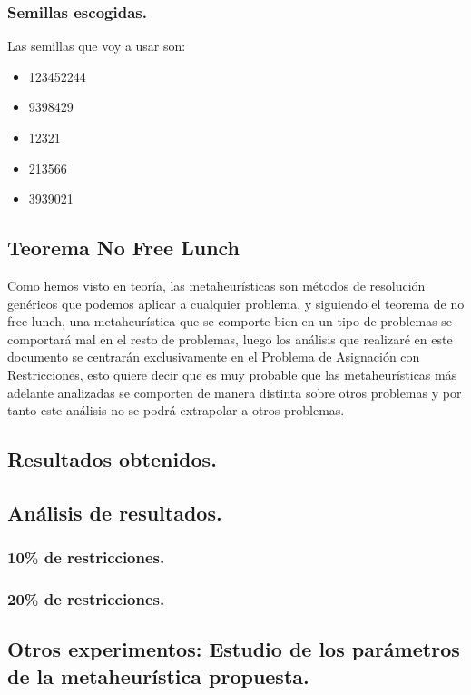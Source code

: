\documentclass[12pt, spanish]{article}
\begin{document}
\subsubsection{Semillas escogidas.}

Las semillas que voy a usar son:

\begin{itemize}
	\item {123452244}
	\item {9398429}
	\item {12321}
	\item {213566}
	\item {3939021}
\end{itemize}

\subsection{Teorema No Free Lunch}

Como hemos visto en teoría, las metaheurísticas son métodos de resolución genéricos que podemos aplicar a cualquier problema, y siguiendo el teorema de no free lunch, una metaheurística que se comporte bien en un tipo de problemas se comportará mal en el resto de problemas, luego los análisis que realizaré en este documento se centrarán exclusivamente en el Problema de Asignación con Restricciones, esto quiere decir que es muy probable que las metaheurísticas más adelante analizadas se comporten de manera distinta sobre otros problemas y por tanto este análisis no se podrá extrapolar a otros problemas.

\newpage

\subsection{Resultados obtenidos.}


\subsection{Análisis de resultados.	}


\subsubsection{10\% de restricciones.}


\subsubsection{20\% de restricciones.}


\subsection{Otros experimentos: Estudio de los parámetros de la metaheurística propuesta.}
\end{document}
